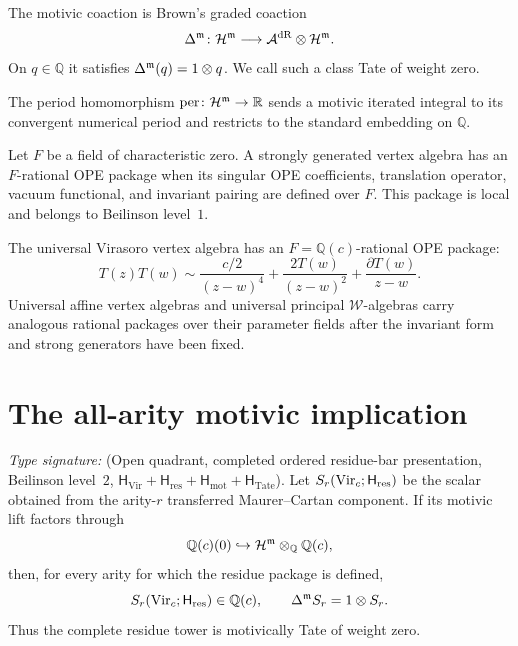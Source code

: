 \begin{definition}
\label{def:vmpar-motivic-coaction}
\ClaimStatusDefinitional
The motivic coaction is Brown's graded coaction
\[
 \Delta^{\mathfrak m}\colon \mathcal H^{\mathfrak m}
 \longrightarrow \mathcal A^{\mathrm{dR}}\otimes\mathcal H^{\mathfrak m}.
\]
On \(q\in\mathbb Q\) it satisfies
\(\Delta^{\mathfrak m}(q)=1\otimes q\).  We call such a class Tate of
weight zero.
\end{definition}

\begin{definition}
\label{def:vmpar-period-map}
\ClaimStatusDefinitional
The period homomorphism
\(\operatorname{per}\colon\mathcal H^{\mathfrak m}\to\mathbb R\)
sends a motivic iterated integral to its convergent numerical period
and restricts to the standard embedding on \(\mathbb Q\).
\end{definition}

\begin{definition}
\label{def:vmpar-q-rational-ope}
\ClaimStatusDefinitional
Let \(F\) be a field of characteristic zero.  A strongly generated
vertex algebra has an \(F\)-rational OPE package when its singular OPE
coefficients, translation operator, vacuum functional, and invariant
pairing are defined over \(F\).  This package is local and belongs to
Beilinson level~\(1\).
\end{definition}

\begin{example}
\label{ex:vmpar-q-rational-families}
The universal Virasoro vertex algebra has an
\(F=\mathbb Q(c)\)-rational OPE package:
\[
 T(z)T(w)\sim \frac{c/2}{(z-w)^4}
 +\frac{2T(w)}{(z-w)^2}+\frac{\partial T(w)}{z-w}.
\]
Universal affine vertex algebras and universal principal
\(\mathcal W\)-algebras carry analogous rational packages over their
parameter fields after the invariant form and strong generators have
been fixed.
\end{example}

\section{The all-arity motivic implication}
\label{sec:vmpar-main}

\begin{theorem}
\label{thm:virasoro-s-r-motivic-purity-all-r}
\ClaimStatusConditional
\emph{Type signature:}
\textup{(Open quadrant, completed ordered residue-bar presentation,
Beilinson level~\(2\),
\(\mathsf H_{\mathrm{Vir}}+\mathsf H_{\mathrm{res}}
+\mathsf H_{\mathrm{mot}}+\mathsf H_{\mathrm{Tate}}\)).}
Let
\(S_r(\mathrm{Vir}_c;\mathsf H_{\mathrm{res}})\) be the scalar obtained from
the arity-\(r\) transferred Maurer--Cartan component.  If its motivic
lift factors through
\[
 \mathbb Q(c)(0)\hookrightarrow
 \mathcal H^{\mathfrak m}\otimes_{\mathbb Q}\mathbb Q(c),
\]
then, for every arity for which the residue package is defined,
\[
 S_r(\mathrm{Vir}_c;\mathsf H_{\mathrm{res}})\in\mathbb Q(c),
 \qquad
 \Delta^{\mathfrak m}S_r=1\otimes S_r.
\]
Thus the complete residue tower is motivically Tate of weight zero.
\end{theorem}

